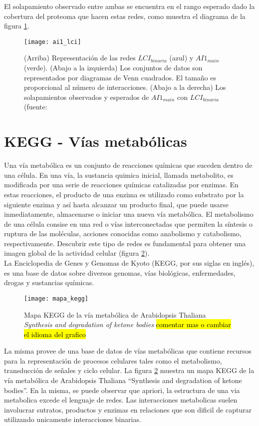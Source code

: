 El solapamiento observado entre ambas se encuentra en el rango esperado dado la cobertura del proteoma que hacen estas redes, como muestra el diagrama de la figura \ref{fig:ai1_lci}.
\begin{figure}[h]
    \centering
    \texttt{[image: ai1\_lci]}
    \caption{(Arriba) Representación de las redes $LCI_{binaria}$ (azul) y $AI1_{main}$ (verde). (Abajo a la izquierda) Los conjuntos de datos son representados por diagramas de Venn cuadrados. El tamaño es proporcional al número de interacciones. (Abajo a la derecha) Los solapamientos observados y esperados de $AI1_{main}$ con $LCI_{binaria}$ (fuente: \cite{Hahn2013}} 
    \label{fig:ai1_lci}
\end{figure}
\section{KEGG - Vías metabólicas}
Una vía metabólica es un conjunto de reacciones químicas que suceden dentro de una célula. En una vía, la sustancia quimica inicial, llamada metabolito, es modificada por una serie de reacciones químicas catalizadas por enzimas. En estas reacciones, el producto de una enzima es utilizado como substrato por la siguiente enzima y así hasta alcanzar un producto final, que puede usarse inmediatamente, almacenarse o iniciar una nueva vía metabólica. El metabolismo de una célula consise en una red o vías interconectadas que permiten la síntesis o ruptura de las moléculas, acciones conocidas como anabolismo y catabolismo, respectivamente. Descubrir este tipo de redes es fundamental para obtener una imagen global de la actividad celular (figura \ref{fig:mapa_kegg}).\\
La Enciclopedia de Genes y Genomas de Kyoto (KEGG, por sus siglas en inglés), es una base de datos sobre diversos genomas, vías biológicas, enfermedades, drogas y sustancias químicas.
\begin{figure}[h]
    \centering
    \texttt{[image: mapa\_kegg]}
    \caption{Mapa KEGG de la vía metabólica de Arabidopsis Thaliana  \textit{Synthesis and degradation of ketone bodies} \hl{comentar mas o cambiar el idioma del grafico}}
    \label{fig:mapa_kegg}
\end{figure}
La misma provee de una base de datos de vías metabólicas que contiene recursos para la representación de procesos celulares tales como el metabolismo, transducción de señales y ciclo celular. La figura \ref{fig:mapa_kegg} muestra un mapa KEGG de la vía metabólica de Arabidopsis Thaliana ``Synthesis and degradation of ketone bodies''. En la misma, se puede observar que apriori, la estructura de una via metabolica excede el lenguaje de redes. Las interacciones metabolicas suelen involucrar sutratos, productos y enzimas en relaciones que son dificil de capturar utilizando unicamente interacciones binarias. 

